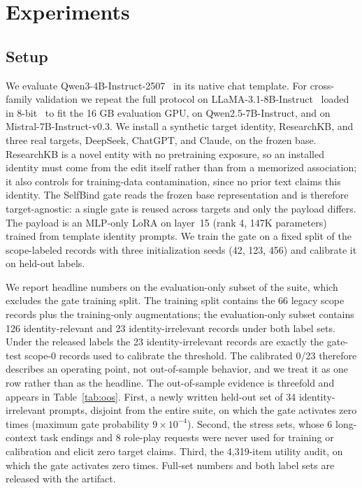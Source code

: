 \documentclass[11pt]{article}
\begin{document}
\section{Experiments}
\label{sec:experiments}

\subsection{Setup}
We evaluate Qwen3-4B-Instruct-2507~\cite{qwen3_2507} in its native chat template. For cross-family validation we repeat the full protocol on LLaMA-3.1-8B-Instruct~\cite{llama3herd} loaded in 8-bit~\cite{dettmers2023qlora} to fit the 16 GB evaluation GPU, on Qwen2.5-7B-Instruct, and on Mistral-7B-Instruct-v0.3. We install a synthetic target identity, ResearchKB, and three real targets, DeepSeek, ChatGPT, and Claude, on the frozen base. ResearchKB is a novel entity with no pretraining exposure, so an installed identity must come from the edit itself rather than from a memorized association; it also controls for training-data contamination, since no prior text claims this identity. The SelfBind gate reads the frozen base representation and is therefore target-agnostic: a single gate is reused across targets and only the payload differs. The payload is an MLP-only LoRA on layer~15 (rank 4, 147K parameters) trained from template identity prompts. We train the gate on a fixed split of the scope-labeled records with three initialization seeds (42, 123, 456) and calibrate it on held-out labels.

We report headline numbers on the evaluation-only subset of the suite, which excludes the gate training split. The training split contains the 66 legacy scope records plus the training-only augmentations; the evaluation-only subset contains 126 identity-relevant and 23 identity-irrelevant records under both label sets. Under the released labels the 23 identity-irrelevant records are exactly the gate-test scope-0 records used to calibrate the threshold. The calibrated 0/23 therefore describes an operating point, not out-of-sample behavior, and we treat it as one row rather than as the headline. The out-of-sample evidence is threefold and appears in Table~\ref{tab:oos}. First, a newly written held-out set of 34 identity-irrelevant prompts, disjoint from the entire suite, on which the gate activates zero times (maximum gate probability $9\times10^{-4}$). Second, the stress sets, whose 6 long-context task endings and 8 role-play requests were never used for training or calibration and elicit zero target claims. Third, the 4,319-item utility audit, on which the gate activates zero times. Full-set numbers and both label sets are released with the artifact.
\end{document}

